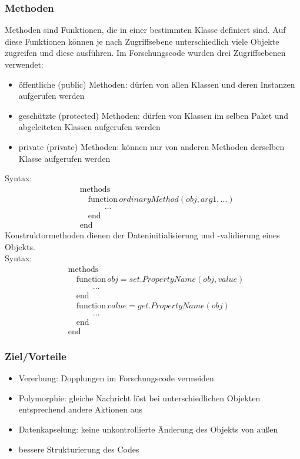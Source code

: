 \documentclass[12pt,bibstyle=none,pagenumberinfooter]{ifmdocument}
\begin{document}
	\subsubsection{Methoden}
	Methoden sind Funktionen, die in einer bestimmten Klasse definiert sind. Auf diese Funktionen k\"onnen je nach Zugriffsebene unterschiedlich viele Objekte zugreifen und diese ausführen. 
	Im Forschungscode wurden drei Zugriffsebenen verwendet: 
	\begin{itemize}
		\item \"offentliche (public) Methoden: d\"urfen von allen Klassen und deren Instanzen aufgerufen werden
		\item gesch\"utzte (protected) Methoden: d\"urfen von Klassen im selben Paket und abgeleiteten Klassen aufgerufen werden
		\item private (private) Methoden: k\"onnen nur von anderen Methoden derselben Klasse aufgerufen werden 
	\end{itemize}
Syntax:
	\begin{align*}
		&\text{methods} \\\
		&\quad\text{function} \, ordinaryMethod(obj,arg1,...) \\
		&\quad \qquad \ldots \\
		&\quad\text{end} \\
		&\text{end}	
	\end{align*}
Konstruktormethoden dienen der Dateninitialisierung und -validierung eines Objekts.\\
Syntax:
	\begin{align*}
		&\text{methods} \\
		&\quad\text{function}\, obj = set.PropertyName(obj,value) \\
		&\quad \qquad \ldots \\               
		&\quad\text{end} \\
		&\quad\text{function}\, value = get.PropertyName(obj)\\
		&\quad \qquad\ldots \\
		&\quad\text{end}\\
		&\text{end}	
	\end{align*}

	\subsubsection{Ziel/Vorteile}
	\begin{itemize}
		\item Vererbung: Dopplungen im Forschungscode vermeiden
		\item Polymorphie: gleiche Nachricht l\"ost bei unterschiedlichen Objekten entsprechend andere Aktionen aus 
		\item Datenkapselung: keine unkontrollierte \"Anderung des Objekts von außen
		\item bessere Strukturierung des Codes
	\end{itemize}
	
\end{document}
